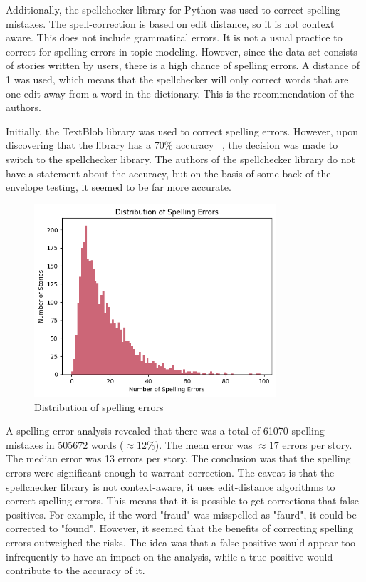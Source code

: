 Additionally, the spellchecker library for Python was used to correct spelling mistakes. The spell-correction is based on edit distance, so it is not context aware. This does not include grammatical errors. It is not a usual practice to correct for spelling errors in topic modeling. However, since the data set consists of stories written by users, there is a high chance of spelling errors. A distance of 1 was used, which means that the spellchecker will only correct words that are one edit away from a word in the dictionary. This is the recommendation of the authors.~\cite{spellchecker2023}

Initially, the TextBlob library was used to correct spelling errors. However, upon discovering that the library has a 70\% accuracy ~\cite{loria2018textblob}, the decision was made to switch to the spellchecker library. The authors of the spellchecker library do not have a statement about the accuracy, but on the basis of some back-of-the-envelope testing, it seemed to be far more accurate.

\begin{figure}[h]
    \centering
    \includegraphics[width=0.8\textwidth]{resources/spelling_mistakes_distribution.png}
    \caption{Distribution of spelling errors}
    \label{fig:spelling_error_distribution}
\end{figure}


A spelling error analysis revealed that there was a total of 61070 spelling mistakes in 505672 words ($\approx 12\%$). The mean error was $\approx17$ errors per story. The median error was 13 errors per story. The conclusion was that the spelling errors were significant enough to warrant correction. The caveat is that the spellchecker library is not context-aware, it uses edit-distance algorithms to correct spelling errors. This means that it is possible to get corrections that false positives. For example, if the word "fraud" was misspelled as "faurd", it could be corrected to "found". However, it seemed that the benefits of correcting spelling errors outweighed the risks. The idea was that a false positive would appear too infrequently to have an impact on the analysis, while a true positive would contribute to the accuracy of it.

